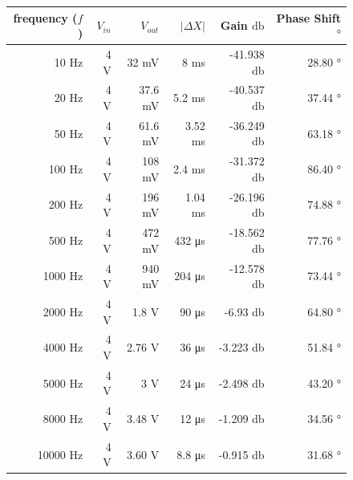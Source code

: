 \documentclass{article}
\begin{document}
\begin{figure}[H]
	\centering
	\begin{tabular}{ | r | r | r | r | r | r | }
		\hline
		frequency ($f$) & $V_{in}$ & $V_{out}$ & $|\Delta X|$ & Gain $\si{\decibel}$ & Phase Shift $\si{\degree}$ \\ \hline
		10 \si{\hertz} & 4 \si{\volt} & 32 \si{\milli\volt} & 8 \si{\milli\second} & -41.938 \si{\decibel} & 28.80 \si{\degree}\\ \hline
		20 \si{\hertz} & 4 \si{\volt} & 37.6 \si{\milli\volt} & 5.2 \si{\milli\second} & -40.537 \si{\decibel} & 37.44 \si{\degree}\\ \hline
		50 \si{\hertz} & 4 \si{\volt} & 61.6 \si{\milli\volt} & 3.52 \si{\milli\second} & -36.249 \si{\decibel} & 63.18 \si{\degree}\\ \hline
		100 \si{\hertz} & 4 \si{\volt} & 108 \si{\milli\volt} & 2.4 \si{\milli\second} & -31.372 \si{\decibel} & 86.40 \si{\degree}\\ \hline
		200 \si{\hertz} & 4 \si{\volt} & 196 \si{\milli\volt} & 1.04 \si{\milli\second} & -26.196 \si{\decibel} & 74.88 \si{\degree}\\ \hline
		500 \si{\hertz} & 4 \si{\volt} & 472 \si{\milli\volt} & 432 \si{\micro\second} & -18.562 \si{\decibel} & 77.76 \si{\degree}\\ \hline
		1000 \si{\hertz} & 4 \si{\volt} & 940 \si{\milli\volt} & 204 \si{\micro\second} & -12.578 \si{\decibel} & 73.44 \si{\degree}\\ \hline
		2000 \si{\hertz} & 4 \si{\volt} & 1.8 \si{\volt} & 90 \si{\micro\second} & -6.93 \si{\decibel} & 64.80 \si{\degree}\\ \hline
		4000 \si{\hertz} & 4 \si{\volt} & 2.76 \si{\volt} & 36 \si{\micro\second} & -3.223 \si{\decibel} & 51.84 \si{\degree}\\ \hline
		5000 \si{\hertz} & 4 \si{\volt} & 3 \si{\volt} & 24 \si{\micro\second} & -2.498 \si{\decibel} & 43.20 \si{\degree}\\ \hline
		8000 \si{\hertz} & 4 \si{\volt} & 3.48 \si{\volt} & 12 \si{\micro\second} & -1.209 \si{\decibel} & 34.56 \si{\degree}\\ \hline
		10000 \si{\hertz} & 4 \si{\volt} & 3.60 \si{\volt} & 8.8 \si{\micro\second} & -0.915 \si{\decibel} & 31.68 \si{\degree}\\ \hline
	\end{tabular}
\end{figure}
\end{document}
